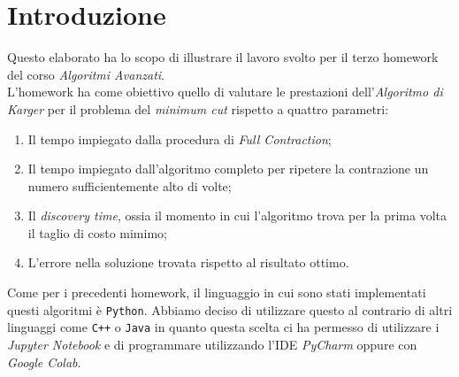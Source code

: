 \section{Introduzione}
Questo elaborato ha lo scopo di illustrare il lavoro svolto per il terzo homework del corso \textit{Algoritmi Avanzati}.\\
L'homework ha come obiettivo quello di valutare le prestazioni dell'\textit{Algoritmo di Karger} per il problema del \textit{minimum cut} rispetto a quattro parametri:
\begin{enumerate}
	\item Il tempo impiegato dalla procedura di \textit{Full Contraction};
	\item Il tempo impiegato dall'algoritmo completo per ripetere la contrazione un numero sufficientemente alto di volte;
	\item Il \textit{discovery time}, ossia il momento in cui l'algoritmo trova per la prima volta il taglio di costo mimimo;
	\item L'errore nella soluzione trovata rispetto al risultato ottimo.
\end{enumerate}
%
Come per i precedenti homework, il linguaggio in cui sono stati implementati questi algoritmi è \texttt{Python}.
Abbiamo deciso di utilizzare questo al contrario di altri linguaggi come \texttt{C++} o \texttt{Java} in quanto questa scelta ci ha permesso di utilizzare i \textit{Jupyter Notebook} e di programmare utilizzando l'IDE \textit{PyCharm} oppure con \textit{Google Colab}.\\

